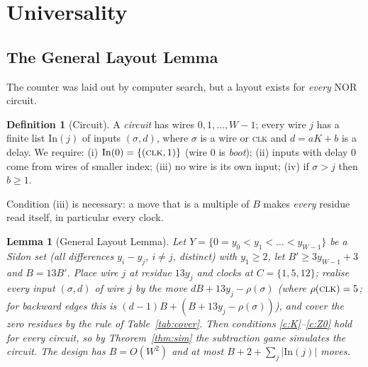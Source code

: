 \documentclass[11pt]{article}
\newtheorem{lemma}[theorem]{Lemma}
\theoremstyle{definition}
\newtheorem{definition}[theorem]{Definition}
\begin{document}
\section{Universality}\label{sec:pspace}


\subsection{The General Layout Lemma}


The counter was laid out by computer search, but a layout exists for \emph{every} NOR circuit.

\begin{definition}[Circuit]\label{def:circuit}
A \emph{circuit} has wires $0,1,\dots,W-1$; every wire $j$ has a finite list $\mathrm{In}(j)$ of inputs
$(\sigma,d)$, where $\sigma$ is a wire or \textsc{clk} and $d=aK+b$ is a delay.  We require:
(i) $\mathrm{In}(0)=\{(\textsc{clk},1)\}$ (wire $0$ is \emph{boot});
(ii) inputs with delay $0$ come from wires of smaller index;
(iii) no wire is its own input;
(iv) if $\sigma>j$ then $b\ge1$.
\end{definition}

Condition (iii) is necessary: a move that is a multiple of $B$ makes \emph{every} residue read
itself, in particular every clock.

\begin{lemma}[General Layout Lemma]\label{lem:gll}
Let $Y=\{0=y_0<y_1<\dots<y_{W-1}\}$ be a Sidon set (all differences $y_i-y_j$, $i\ne j$, distinct)
with $y_1\ge 2$, let $B'\ge 3y_{W-1}+3$ and $B=13B'$.  Place wire $j$ at residue $13y_j$ and clocks at
$C=\{1,5,12\}$; realise every input $(\sigma,d)$ of wire $j$ by the move $dB+13y_j-\rho(\sigma)$
(where $\rho(\textsc{clk})=5$; for backward edges this is $(d-1)B+(B+13y_j-\rho(\sigma))$), and cover
the zero residues by the rule of Table~\ref{tab:cover}.  Then conditions \ref{c:K}--\ref{c:Z0} hold for
every circuit, so by Theorem~\ref{thm:sim} the subtraction game simulates the circuit.  The design has
$B=O(W^2)$ and at most $B+2+\sum_j|\mathrm{In}(j)|$ moves.
\end{lemma}
\end{document}
